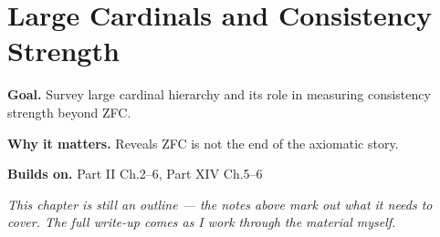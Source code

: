 \chapter{Large Cardinals and Consistency Strength}
\label{ch:14-metamathematics-10}

\begin{chapterintro}
\textbf{Goal.} Survey large cardinal hierarchy and its role in measuring consistency strength beyond ZFC.

\textbf{Why it matters.} Reveals ZFC is not the end of the axiomatic story.

\textbf{Builds on.} Part II Ch.2–6, Part XIV Ch.5–6
\end{chapterintro}

\textit{This chapter is still an outline --- the notes above mark out what it needs to cover. The full write-up comes as I work through the material myself.}
